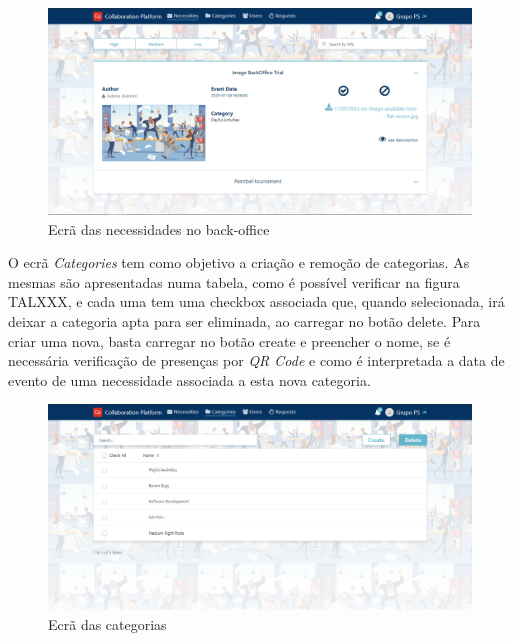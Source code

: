 \begin{figure}[H]
  \centering 
  \includegraphics[scale=0.35]{figures/backoffice_necessities.png}
  \caption{Ecrã das necessidades no back-office}\label{fig:backoffice_necessities}
\end{figure}



O ecrã \textit{Categories} tem como objetivo a criação e remoção de categorias. 
As mesmas são apresentadas numa tabela, como é possível verificar na figura TALXXX, e cada uma tem uma checkbox associada que, quando selecionada, irá deixar a categoria apta para ser eliminada, ao carregar no botão delete. 
Para criar uma nova, basta carregar no botão create e preencher o nome, se é necessária verificação de presenças por \textit{QR Code} e como é interpretada a data de evento de uma necessidade associada a esta nova categoria.

\begin{figure}[H]
  \centering 
  \includegraphics[scale=0.35]{figures/backoffice_categories.png}
  \caption{Ecrã das categorias}\label{fig:backoffice_categories}
\end{figure}



